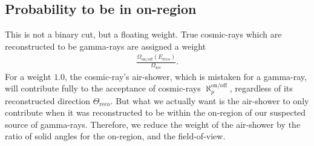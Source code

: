 \documentclass[a4paper,12pt,oneside]{article}
\begin{document}
\subsection{Probability to be in on-region}
\label{SecProbabilityToBeOnRegion}
%
This is not a binary cut, but a floating weight.
%
True cosmic-rays which are reconstructed to be gamma-rays are assigned a weight
%
\begin{eqnarray*}
\frac{\Omega_\text{on/off}(E_\text{reco})}{\Omega_\text{fov}}.
\end{eqnarray*}
%
For a weight $1.0$, the cosmic-ray's air-shower, which is mistaken for a gamma-ray, will contribute fully to the acceptance of cosmic-rays $\aleph^\text{on/off}_p$, regardless of its reconstructed direction $\Theta_\text{reco}$.
%
But what we actually want is the air-shower to only contribute when it was reconstructed to be within the on-region of our suspected source of gamma-rays.
%
Therefore, we reduce the weight of the air-shower by the ratio of solid angles for the on-region, and the field-of-view.
%
\end{document}
